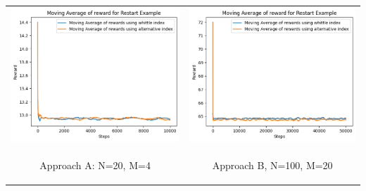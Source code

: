 \documentclass{slides}
\begin{document}
{%
\begin{center}
\begin{tabular}{cc}
\includegraphics[scale=0.6]{comparison_A_homo_restart.png} &
\includegraphics[scale=0.6]{Moving Average of reward for Restart Example_final.png} \\
\begin{small}
 Approach A: N=20, M=4\end{small} & \begin{small}Approach B, N=100, M=20\end{small}\\

\end{tabular}
\end{center}}
\end{document}
